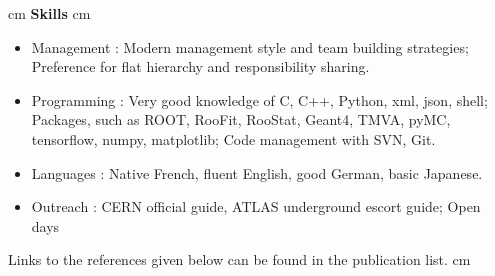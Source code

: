 \documentclass[12pt]{article}
\begin{document}
 cm
{\bf \large Skills}
 cm
\TabPositions{3.2cm}
\begin{itemize}
\itemsep0.3em
\item[] Management : Modern management style and team building strategies;
  Preference for flat hierarchy and responsibility sharing.
\item[] Programming : Very good knowledge of C, C++, Python, xml, json, shell;
  Packages, such as ROOT, RooFit, RooStat, Geant4, TMVA, pyMC, 
 tensorflow, numpy, matplotlib;
  Code management with SVN, Git.
 \item[] Languages : Native French, fluent English, good German, basic Japanese.
 \item[] Outreach : CERN official guide, ATLAS underground escort guide; Open days

\end{itemize}

\newpage

Links to the references given below can be found in the publication list.
 cm
\end{document}
